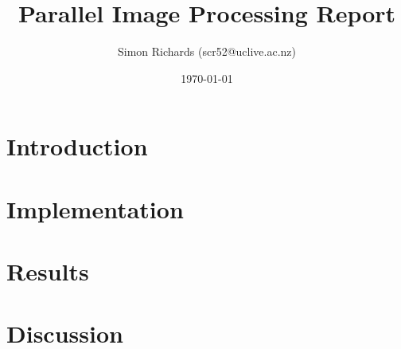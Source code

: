 \documentclass{article}
\title{Parallel Image Processing Report}
\date{\today}
\author{Simon Richards (scr52@uclive.ac.nz)}
\begin{document}
\maketitle
\section{Introduction}

\section{Implementation}

\section{Results}

\section{Discussion}
\end{document}
